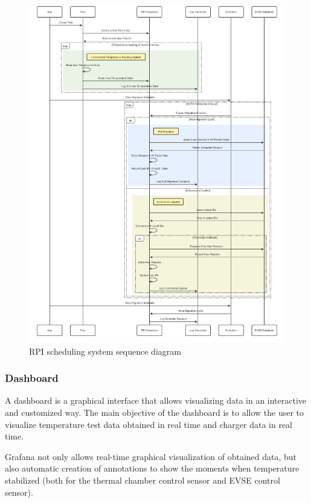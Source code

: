 \begin{figure}[H]
\begin{minipage}{0.48\textwidth}
        \includegraphics[scale=0.10]{figures/scheduling_2.pdf}
        \caption{RPI scheduling system sequence diagram}
        \label{fig:scheduling_2}
    \end{minipage}
\end{figure}

\subsubsection{Dashboard}
A dashboard is a graphical interface that allows visualizing data in an interactive and customized way. The main objective of the dashboard is to allow the user to visualize temperature test data obtained in real time and charger data in real time.

Grafana not only allows real-time graphical visualization of obtained data, but also automatic creation of annotations to show the moments when temperature stabilized (both for the thermal chamber control sensor and EVSE control sensor).

